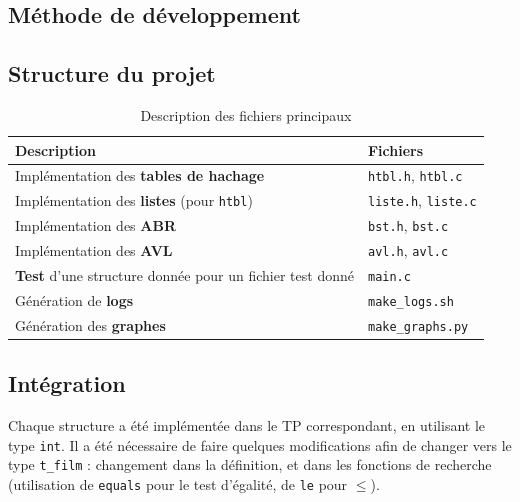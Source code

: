 \documentclass[a4paper, 12pt, twoside]{article}
\begin{document}
\begin{indt}{\section{Méthode de développement}}
\begin{indt}{\subsection{Structure du projet}}
\begin{table}[H]
                \begin{tabular}{|l|l|}
                    \hline
                    Description
                    & Fichiers
                    \\
                    \hline
                    \hline
                    Implémentation des \textbf{tables de hachage}
                    & \texttt{htbl.h}, \texttt{htbl.c}
                    \\
                    \hline
                    Implémentation des \textbf{listes} (pour \texttt{htbl})
                    & \texttt{liste.h}, \texttt{liste.c}
                    \\
                    \hline
                    Implémentation des \textbf{ABR}
                    & \texttt{bst.h}, \texttt{bst.c}
                    \\
                    \hline
                    Implémentation des \textbf{AVL}
                    & \texttt{avl.h}, \texttt{avl.c}
                    \\
                    \hline
                    \textbf{Test} d'une structure donnée pour un fichier test donné
                    & \texttt{main.c}
                    \\
                    \hline
                    Génération de \textbf{logs}
                    & \texttt{make\_logs.sh}
                    \\
                    \hline
                    Génération des \textbf{graphes}
                    & \texttt{make\_graphs.py}
                    \\
                    \hline
                \end{tabular}
            
                \caption{Description des fichiers principaux}
                \label{tab:file_desc}
            \end{table}%
        \end{indt} %

        \begin{indt}{\subsection{Intégration}} %
            Chaque structure a été implémentée dans le TP correspondant, en utilisant le type \texttt{int}.
            Il a été nécessaire de faire quelques modifications afin de changer vers le type \texttt{t\_film} : changement dans la définition, et dans les fonctions de recherche (utilisation de \texttt{equals} pour le test d'égalité, de \texttt{le} pour $\le$).
        \end{indt} %


\end{indt}
\end{document}
